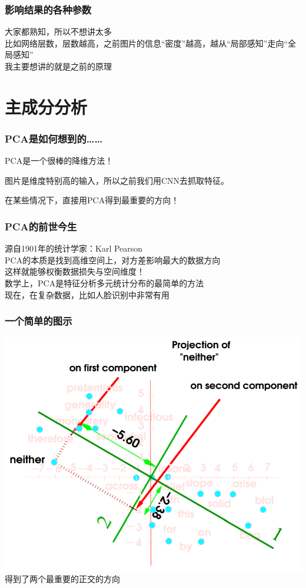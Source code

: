 \documentclass[24pt]{beamer}
\begin{document}
\begin{frame}
\frametitle{影响结果的各种参数}
大家都熟知，所以不想讲太多\\
比如网络层数，层数越高，之前图片的信息“密度”越高，越从“局部感知”走向“全局感知”\\
我主要想讲的就是之前的原理
\end{frame}
\section{主成分分析}
\begin{frame}
\frametitle{PCA是如何想到的……}
\begin{center}
PCA是一个很棒的降维方法！\\
\end{center}
\bigskip
图片是维度特别高的输入，所以之前我们用CNN去抓取特征。\\
\begin{center}
在某些情况下，直接用PCA得到最重要的方向！
\end{center}
\end{frame}
\begin{frame}
\frametitle{PCA的前世今生}
源自1901年的统计学家：Karl Pearson\\
\bigskip
PCA的本质是找到高维空间上，对方差影响最大的数据方向\\
这样就能够权衡数据损失与空间维度！\\
\bigskip
数学上，PCA是特征分析多元统计分布的最简单的方法\\
现在，在复杂数据，比如人脸识别中非常有用
\end{frame}
\begin{frame}
\frametitle{一个简单的图示}
\begin{center}
\includegraphics[width=0.8\linewidth]{fig19.png}
\\
得到了两个最重要的正交的方向
\end{center}
\end{frame}
\end{document}
